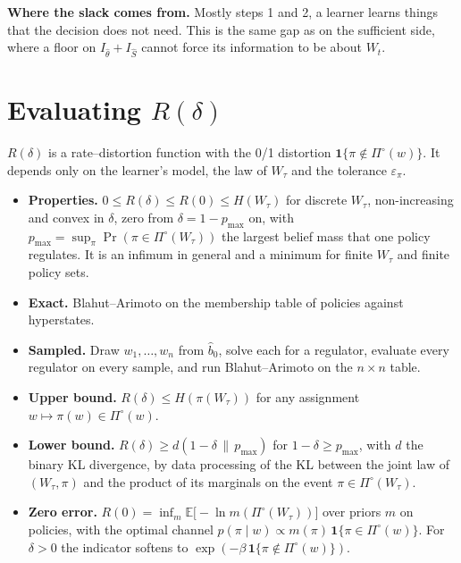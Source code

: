 \documentclass[10pt]{article}
\newcommand{\E}{\mathbb E}
\begin{document}
\noindent\textbf{Where the slack comes from.}
Mostly steps 1 and 2, a learner learns things that the decision does not need.
This is the same gap as on the sufficient side, where a floor on $I_{\hat\theta} + I_{\hat S}$ cannot force its information to be about $W_t$.

\section{Evaluating $R(\delta)$}
$R(\delta)$ is a rate--distortion function with the 0/1 distortion $\mathbf 1\{\pi \notin \Pi^\circ(w)\}$.
It depends only on the learner's model, the law of $W_\tau$ and the tolerance $\varepsilon_\pi$.
\begin{itemize}
  \item \textbf{Properties.}
  $0 \le R(\delta) \le R(0) \le H(W_\tau)$ for discrete $W_\tau$, non-increasing and convex in $\delta$, zero from $\delta = 1 - p_{\max}$ on, with $p_{\max} = \sup_\pi \Pr(\pi \in \Pi^\circ(W_\tau))$ the largest belief mass that one policy regulates.
  It is an infimum in general and a minimum for finite $W_\tau$ and finite policy sets.
  \item \textbf{Exact.}
  Blahut--Arimoto on the membership table of policies against hyperstates.
  \item \textbf{Sampled.}
  Draw $w_1, \dots, w_n$ from $\hat b_0$, solve each for a regulator, evaluate every regulator on every sample, and run Blahut--Arimoto on the $n \times n$ table.
  \item \textbf{Upper bound.}
  $R(\delta) \le H(\pi(W_\tau))$ for any assignment $w \mapsto \pi(w) \in \Pi^\circ(w)$.
  \item \textbf{Lower bound.}
  $R(\delta) \ge d(1 - \delta \,\|\, p_{\max})$ for $1 - \delta \ge p_{\max}$, with $d$ the binary KL divergence, by data processing of the KL between the joint law of $(W_\tau, \pi)$ and the product of its marginals on the event $\pi \in \Pi^\circ(W_\tau)$.
  \item \textbf{Zero error.}
  $R(0) = \inf_m \E\big[-\ln m(\Pi^\circ(W_\tau))\big]$ over priors $m$ on policies, with the optimal channel $p(\pi \mid w) \propto m(\pi)\, \mathbf 1\{\pi \in \Pi^\circ(w)\}$.
  For $\delta > 0$ the indicator softens to $\exp(-\beta\, \mathbf 1\{\pi \notin \Pi^\circ(w)\})$.
\end{itemize}
\end{document}
